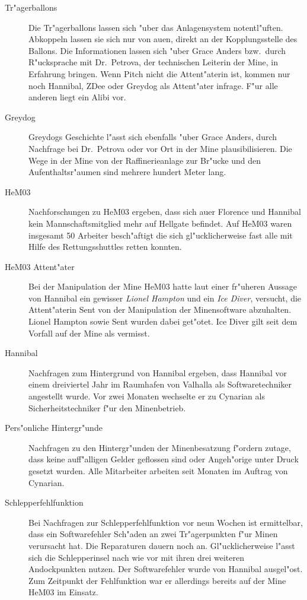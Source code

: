 \begin{description}
	\item[Tr"agerballons] Die Tr"agerballons lassen sich "uber das Anlagensystem notentl"uften. Abkoppeln lassen sie sich nur von au\3en, 
		direkt an der Kopplungsstelle des Ballons. Die Informationen lassen sich "uber Grace Anders bzw.~durch R"ucksprache mit Dr.~Petrova, der technischen Leiterin der Mine, in Erfahrung bringen. Wenn Pitch nicht die Attent"aterin ist, kommen nur noch Hannibal, ZDee oder Greydog als Attent"ater infrage. F"ur alle anderen liegt ein Alibi vor.
	\item[Greydog] Greydogs Geschichte l"asst sich ebenfalls "uber Grace Anders, durch Nachfrage bei Dr.~Petrova oder vor Ort in der Mine 
		plausibilisieren. Die Wege in der Mine von der Raffinerieanlage zur Br"ucke und den Aufenthaltsr"aumen sind mehrere hundert Meter lang.
	\item[HeM03] Nachforschungen zu HeM03 ergeben, dass sich au\3er Florence und Hannibal kein Mannschaftsmitglied mehr auf Hellgate befindet. Auf HeM03 waren insgesamt 50 Arbeiter besch"aftigt die sich gl"ucklicherweise fast alle mit Hilfe des Rettungsshuttles retten konnten. 
	\item[HeM03 Attent"ater] Bei der Manipulation der Mine HeM03 hatte laut einer fr"uheren Aussage von Hannibal ein gewisser \emph{Lionel 
		Hampton} und ein \emph{Ice Diver}, versucht, die Attent"aterin Sent von der Manipulation der Minensoftware abzuhalten. Lionel Hampton sowie Sent wurden dabei get"otet. Ice Diver gilt seit dem Vorfall auf der Mine als vermisst.
	\item[Hannibal] Nachfragen zum Hintergrund von Hannibal ergeben, dass Hannibal vor einem dreiviertel Jahr im Raumhafen von Valhalla als 
		Softwaretechniker angestellt wurde. Vor zwei Monaten wechselte er zu Cynarian als Sicherheitstechniker f"ur den Minenbetrieb.
	\item[Pers"onliche Hintergr"unde] Nachfragen zu den Hintergr"unden der Minenbesatzung f"ordern zutage, dass keine auff"alligen Gelder 
		geflossen sind oder Angeh"orige unter Druck gesetzt wurden. Alle Mitarbeiter arbeiten seit Monaten im Auftrag von Cynarian.
	\item[Schlepperfehlfunktion] Bei Nachfragen zur Schlepperfehlfunktion vor neun Wochen ist ermittelbar, dass ein Softwarefehler Sch"aden 
		an zwei Tr"agerpunkten f"ur Minen verursacht hat. Die Reparaturen dauern noch an. Gl"ucklicherweise l"asst sich die Schlepperinsel nach wie vor mit ihren drei weiteren Andockpunkten nutzen. Der Softwarefehler wurde von Hannibal ausgel"ost. Zum Zeitpunkt der Fehlfunktion war er allerdings bereits auf der Mine HeM03 im Einsatz.

\end{description}
